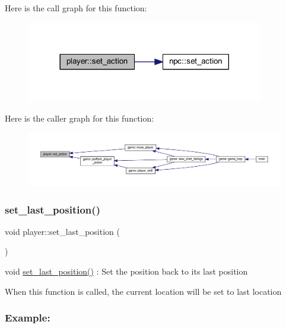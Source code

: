 Here is the call graph for this function\+:
\nopagebreak
\begin{figure}[H]
\begin{center}
\leavevmode
\includegraphics[width=293pt]{classplayer_aa673c84d7b56badc58d7c467325cbf88_cgraph}
\end{center}
\end{figure}
Here is the caller graph for this function\+:
\nopagebreak
\begin{figure}[H]
\begin{center}
\leavevmode
\includegraphics[width=350pt]{classplayer_aa673c84d7b56badc58d7c467325cbf88_icgraph}
\end{center}
\end{figure}
\mbox{\label{classplayer_a3bf8cc80800146684a3dbf28c0c4a83c}} 
\subsubsection{\texorpdfstring{set\+\_\+last\+\_\+position()}{set\_last\_position()}}
{\footnotesize\ttfamily void player\+::set\+\_\+last\+\_\+position (\begin{DoxyParamCaption}{ }\end{DoxyParamCaption})}



void \hyperlink{classplayer_a3bf8cc80800146684a3dbf28c0c4a83c}{set\+\_\+last\+\_\+position()} \+: Set the position back to its last position 

When this function is called, the current location will be set to last location

\subsubsection*{Example\+: }

